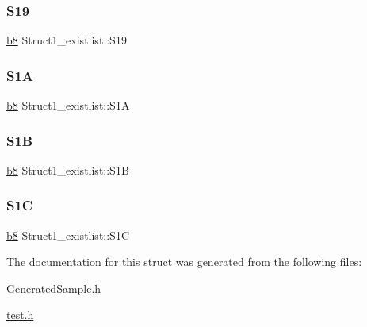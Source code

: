 \subsubsection{\texorpdfstring{S19}{S19}}
{\footnotesize\ttfamily \hyperlink{ab__common_8h_a70e369648385b50f2d0588e8e8745275}{b8} Struct1\+\_\+existlist\+::\+S19}

\mbox{\label{structStruct1__existlist_a7f046abe604d113d70a4dd771a070dab}} 
\subsubsection{\texorpdfstring{S1A}{S1A}}
{\footnotesize\ttfamily \hyperlink{ab__common_8h_a70e369648385b50f2d0588e8e8745275}{b8} Struct1\+\_\+existlist\+::\+S1A}

\mbox{\label{structStruct1__existlist_a9ff78445079c047dae43b4dedbfaee8f}} 
\subsubsection{\texorpdfstring{S1B}{S1B}}
{\footnotesize\ttfamily \hyperlink{ab__common_8h_a70e369648385b50f2d0588e8e8745275}{b8} Struct1\+\_\+existlist\+::\+S1B}

\mbox{\label{structStruct1__existlist_a51481020415f093e99369044246b67dd}} 
\subsubsection{\texorpdfstring{S1C}{S1C}}
{\footnotesize\ttfamily \hyperlink{ab__common_8h_a70e369648385b50f2d0588e8e8745275}{b8} Struct1\+\_\+existlist\+::\+S1C}



The documentation for this struct was generated from the following files\+:\begin{DoxyCompactItemize}
\item 
\hyperlink{GeneratedSample_8h}{Generated\+Sample.\+h}\item 
\hyperlink{test_8h}{test.\+h}\end{DoxyCompactItemize}

